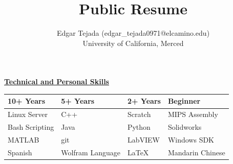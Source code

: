 \documentclass [11pt]{article}
\title{Public Resume}
\author{Edgar Tejada (edgar_tejada0971@elcamino.edu)\\University of California, Merced}
\begin{document}
\begin{flushleft}


\raggedright \underline{\textbf{Technical and Personal Skills}}
\linebreak
{
\centering
\begin{tabularx}{0.8\textwidth} { 
  | >{\centering\arraybackslash}X | 
  | >{\centering\arraybackslash}X | 
  | >{\centering\arraybackslash}X | 
  | >{\centering\arraybackslash}X |}

	\hline
	\textbf{10+ Years} & \textbf{5+ Years} & \textbf{2+ Years} & \textbf{Beginner}\\ [0.5ex]
	\hline
	Linux Server & C++ & Scratch & MIPS Assembly\\ [0.5ex]
	\hline
	Bash Scripting & Java & Python & Solidworks\\ [0.5ex]
	\hline
	MATLAB & git & LabVIEW & Windows SDK\\ [0.5ex]
	\hline
	Spanish & Wolfram Language & \LaTeX & Mandarin Chinese\\ [0.5ex]
	\hline
\end{tabularx}

}
\raggedright


\end{flushleft}
\end{document}
